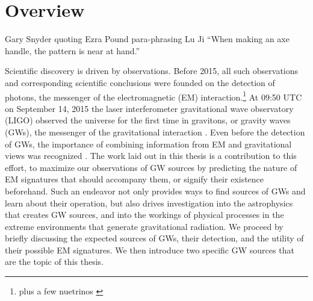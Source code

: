 \chapter[Overview]{Overview} \label{ch:intro}
%
%
%
%
%
%
%
\vspace{-16pt} \begin{chapquote}{Gary Snyder quoting Ezra Pound para-phrasing Lu Ji} \singlespacing ``When making an axe handle, the pattern is near at hand.'' 
 \end{chapquote} \vspace{-8pt}
\noindent\makebox[\linewidth]{\rule{0.5\textwidth}{0.5pt}} \vspace{1pt}

Scientific discovery is driven by observations. Before 2015, all such
observations and corresponding scientific conclusions were founded on the
detection of photons, the messenger of the electromagnetic (EM)
interaction.\footnote{
plus a few nuetrinos
\citep{Haxton:SolarNeutrinos:2013, Hirata:1987, Bionta:1987, ICECUBE:2013:detection}
} 
At 09:50 UTC on September 14, 2015 the laser interferometer gravitational wave
observatory (LIGO) observed the universe for the first time in gravitons, or
gravity waves (GWs), the messenger of the gravitational interaction
\citep{GW150914:2016}. Even before the detection of GWs, the importance of
combining information from EM and gravitational views was recognized
\citep[\textit{e.g.}][]{ThorneBraginsky:1976,Phinney:2009}. The
work laid out in this thesis is a contribution to this effort, to maximize our
observations of GW sources by predicting the nature of EM signatures that
should accompany them, or signify their existence beforehand. Such an endeavor
not only provides ways to find sources of GWs and learn about their operation,
but also drives investigation into the astrophysics that creates GW sources,
and into the workings of physical processes in the extreme environments that
generate gravitational radiation. We proceed by briefly discussing the
expected sources of GWs, their detection, and the utility of their possible EM
signatures. We then introduce two specific GW sources that are the topic of
this thesis.



